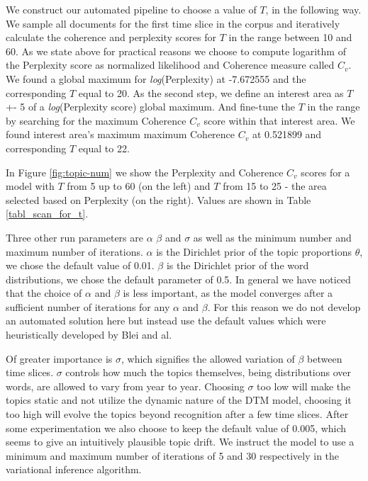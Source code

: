 \documentclass[12pt,journal,letterpaper,oneside,onecolumn]{IEEEtran}
\begin{document}
We construct our automated pipeline to choose a value of $T$, in the following way. We sample all documents for the first time slice in the corpus and iteratively calculate the coherence and perplexity scores for $T$ in the range between 10 and 60. As we state above for practical reasons we choose to compute logarithm of the Perplexity score as normalized likelihood and Coherence measure called $C_v$. We found a global maximum for \textit{log}(Perplexity) at -7.672555 and the corresponding $T$ equal to 20. As the second step, we define an interest area as $T$ +- 5 of a \textit{log}(Perplexity score) global maximum. And fine-tune the $T$ in the range by searching for the maximum Coherence $C_v$ score within that interest area. We found interest area's maximum maximum Coherence $C_v$ at 0.521899 and corresponding $T$ equal to 22.

In Figure \ref{fig:topic-num} we show the Perplexity and Coherence $C_v$ scores for a model with $T$ from 5 up to 60 (on the left) and $T$ from 15 to 25 - the area selected based on Perplexity (on the right). Values are shown in Table \ref{tabl_scan_for_t}.

Three other run parameters are $\alpha$ $\beta$ and $\sigma$  as well as the minimum number and maximum number of iterations. 
$\alpha $ is the Dirichlet prior of the topic proportions $\theta$, we chose the default value of 0.01. $\beta$ is the Dirichlet prior of the word distributions, we chose the default parameter of 0.5.
In general we have noticed that the choice of $\alpha$ and $\beta$ is less important, as the model converges after a sufficient number of iterations for any $\alpha$ and $\beta$. For this reason we do not develop an automated solution here but instead use the default values which were heuristically developed by Blei and al.

Of greater importance is $\sigma$, which signifies the allowed variation of $\beta$ between time slices. $\sigma$ controls how much the topics themselves, being distributions over words, are allowed to vary from year to year.
Choosing $\sigma$ too low will make the topics static and not utilize the dynamic nature of the DTM model, choosing it too high will evolve the topics beyond recognition after a few time slices.
After some experimentation we also choose to keep the default value of 0.005, which seems to give an intuitively plausible topic drift. 
We instruct the model to use a minimum and maximum number of iterations of 5 and 30 respectively in the variational inference algorithm.
\end{document}

